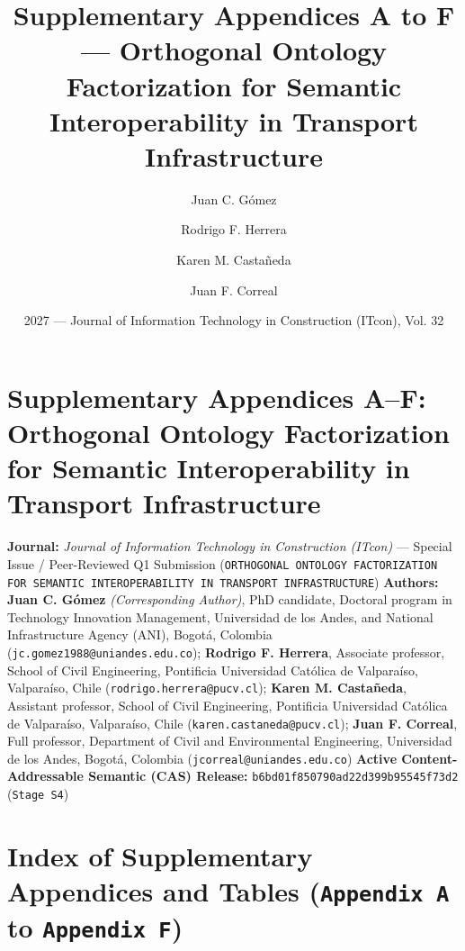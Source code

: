 \documentclass[10pt,a4paper]{article}
\title{Supplementary Appendices A to F --- Orthogonal Ontology Factorization for Semantic Interoperability in Transport Infrastructure}
\author{Juan C. G\'omez \and Rodrigo F. Herrera \and Karen M. Casta\~neda \and Juan F. Correal}
\date{2027 --- Journal of Information Technology in Construction (ITcon), Vol. 32}
\begin{document}
\maketitle

\section*{Supplementary Appendices A--F: Orthogonal Ontology Factorization for Semantic Interoperability in Transport Infrastructure}

\textbf{Journal:} \textit{Journal of Information Technology in Construction (ITcon)} --- Special Issue / Peer-Reviewed Q1 Submission (\texttt{ORTHOGONAL ONTOLOGY FACTORIZATION FOR SEMANTIC INTEROPERABILITY IN TRANSPORT INFRASTRUCTURE})
\textbf{Authors:} \textbf{Juan C. Gómez} \textit{(Corresponding Author)}, PhD candidate, Doctoral program in Technology Innovation Management, Universidad de los Andes, and National Infrastructure Agency (ANI), Bogotá, Colombia (\texttt{jc.gomez1988@uniandes.edu.co}); \textbf{Rodrigo F. Herrera}, Associate professor, School of Civil Engineering, Pontificia Universidad Católica de Valparaíso, Valparaíso, Chile (\texttt{rodrigo.herrera@pucv.cl}); \textbf{Karen M. Castañeda}, Assistant professor, School of Civil Engineering, Pontificia Universidad Católica de Valparaíso, Valparaíso, Chile (\texttt{karen.castaneda@pucv.cl}); \textbf{Juan F. Correal}, Full professor, Department of Civil and Environmental Engineering, Universidad de los Andes, Bogotá, Colombia (\texttt{jcorreal@uniandes.edu.co})
\textbf{Active Content-Addressable Semantic (CAS) Release:} \texttt{b6bd01f850790ad22d399b95545f73d2} (\texttt{Stage S4})



\section*{Index of Supplementary Appendices and Tables (\texttt{Appendix A} to \texttt{Appendix F})}
\end{document}
